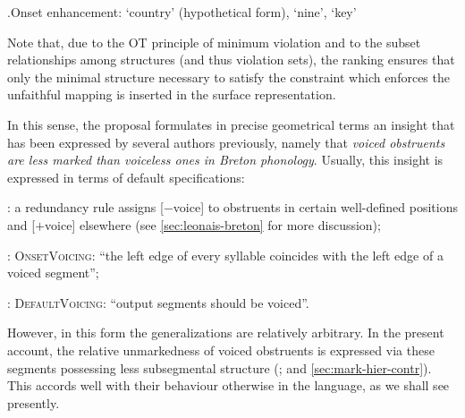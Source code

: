 \ex.\label{onset-enhancement-tableau}Onset enhancement: \ipa{[ˈbroː]} `country' (hypothetical form), \ipa{[ˈnɔː]} `nine', \ipa{[ˈalve]} `key'\\

Note that, due to the OT principle of minimum violation and to the subset relationships among structures (and thus violation sets), the ranking ensures that only the minimal structure necessary to satisfy the constraint which enforces the unfaithful mapping is inserted in the surface representation.

In this sense, the proposal formulates in precise geometrical terms an insight that has been expressed by several authors previously, namely that \emph{voiced obstruents are less marked than voiceless ones in Breton phonology}. Usually, this insight is expressed in terms of default specifications:

\begin{itemize*}
\item \citet{carlyle88:_breton}: a redundancy rule assigns [$-$voice] to obstruents in certain well\hyp defined positions and [$+$voice] elsewhere (see \cref{sec:leonais-breton} for more discussion);
\item \citet{kramer-breton}: \textsc{OnsetVoicing}: \enquote{the left edge of every syllable coincides with the left edge of a voiced segment};
\item \citet{hall09:_laryn_breton}: \textsc{DefaultVoicing}: \enquote{output segments should be voiced}.
\end{itemize*}

However, in this form the generalizations are relatively arbitrary. In the present account, the relative unmarkedness of voiced obstruents is expressed via these segments possessing less subsegmental structure (\citealp{rice96:_defaul_variab,rice03:_featur,causley99:_compl_optim_theor}; and \cref{sec:mark-hier-contr}). This accords well with their behaviour otherwise in the language, as we shall see presently.

